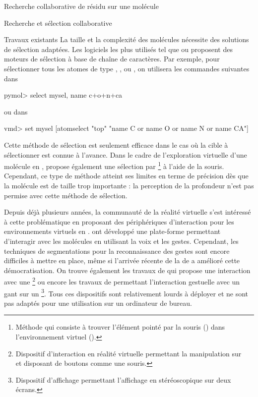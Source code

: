 \documentclass[myfrancais]{mythesis}
\begin{document}
\begin{mychapter}{Recherche collaborative de résidu sur une molécule}
\begin{mysection}{Recherche et sélection collaborative}
\begin{mysubsection}{Travaux existants}
				La taille et la complexité des molécules nécessite des solutions de sélection adaptées.
				Les logiciels les plus utilisés tel que \myPyMOL ou  proposent des moteurs de sélection à base de chaîne de caractères.
				Par exemple, pour sélectionner tous les atomes de type , ,  ou , on utilisera les commandes suivantes dans \myPyMOL
				\begin{mySource*}[language={}]
pymol> select mysel, name c+o+n+ca
				\end{mySource*}
				ou dans 
				\begin{mySource*}[language={}]
vmd> set mysel [atomselect "top" "name C or name O or name N or name CA"]
				\end{mySource*}
				Cette méthode de sélection est seulement efficace dans le cas où la cible à sélectionner est connue à l'avance.
				Dans le cadre de l'exploration virtuelle d'une molécule en \myThreeD,  propose également une sélection par \footnote{Méthode qui consiste à trouver l'élément pointé par la souris (\myTwoD) dans l'environnement virtuel (\myThreeD).} à l'aide de la souris.
				Cependant, ce type de méthode atteint ses limites en terme de précision dès que la molécule est de taille trop importante : la perception de la profondeur n'est pas permise avec cette méthode de sélection.

				Depuis déjà plusieurs années, la communauté de la réalité virtuelle s'est intéressé à cette problématique en proposant des périphériques d'interaction pour les environnements virtuels en \myThreeD.
				 ont développé une plate-forme permettant d'interagir avec les molécules en utilisant la voix et les gestes.
				Cependant, les techniques de segmentations pour la reconnaissance des gestes sont encore difficiles à mettre en place, même si l'arrivée récente de la \myKinect de \myMicrosoft a amélioré cette démocratisation.
				On trouve également les travaux de  qui propose une interaction avec une \footnote{Dispositif d'interaction en réalité virtuelle permettant la manipulation sur ~ et disposant de boutons comme une souris.} ou encore les travaux de  permettant l'interaction gestuelle avec un gant sur un \footnote{Dispositif d'affichage permettant l'affichage en \myThreeD stéréoscopique sur deux écrans.}.
				Tous ces dispositifs sont relativement lourds à déployer et ne sont pas adaptés pour une utilisation sur un ordinateur de bureau.


\end{mysubsection}
\end{mysection}
\end{mychapter}
\end{document}
